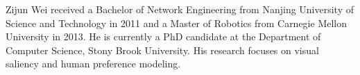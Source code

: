 \documentclass[10pt,journal,compsoc]{IEEEtran}
\begin{document}

%



%
%
%
%
%
% 

 \begin{IEEEbiography}{Zijun Wei} received a Bachelor of Network Engineering from Nanjing University of Science and Technology in 2011 and a Master of Robotics from Carnegie Mellon University in 2013. He is currently a PhD candidate at the Department of Computer Science, Stony Brook University. His research focuses on visual saliency and human preference modeling. 
\end{IEEEbiography}
\end{document}

